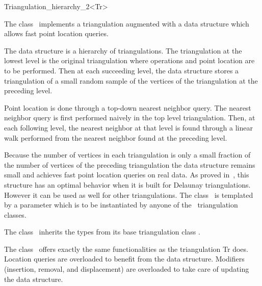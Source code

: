 

\begin{ccRefClass}{Triangulation_hierarchy_2<Tr>}

\ccDefinition
The class \ccRefName\ implements a triangulation augmented with
a data structure which allows fast point location queries.

The data structure is a hierarchy 
of triangulations. The triangulation at the lowest level is
the original triangulation where operations and point location are to 
be performed.
Then at each succeeding level, the data structure
stores a triangulation of a small random sample of the vertices
of the triangulation at the preceding level. 

Point location
is done through a top-down nearest neighbor query.
The nearest neighbor query is first
performed naively in the top level triangulation.
Then, at each following level, the nearest neighbor at that level
is found through a linear walk performed from
the nearest neighbor found at the preceding level.

Because the number of vertices in each triangulation is only a small
fraction of the number of vertices of the preceding triangulation 
the data structure remains small and achieves fast point location 
queries on real
data. As proved in~\cite{d-iirdt-98}, this structure has an optimal behavior
when it is built for Delaunay triangulations.
However it can be used as well for other triangulations.
The class \ccRefName\ is templated by a parameter
which is to be instantiated by anyone of the \cgal\ triangulation
classes.


\ccInheritsFrom
{}

\ccTypes
The class \ccRefName\ inherits the types from its base triangulation
class . 

The class \ccRefName\ offers exactly the same functionalities
as the triangulation Tr does.
Location queries are overloaded to benefit from the
data structure. Modifiers (insertion, removal, and displacement) are overloaded
to take care of updating the data structure.


\end{ccRefClass}
